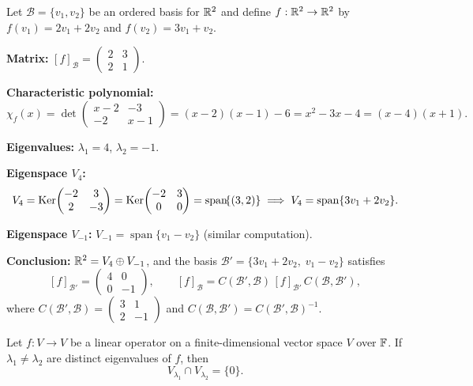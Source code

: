 \begin{exbox}
\label{ex:char-poly}
Let $\mathcal{B}=\{v_1,v_2\}$ be an ordered basis for $\mathbb{R}^2$ and define
$f:\mathbb{R}^2\to\mathbb{R}^2$ by $f(v_1)=2v_1+2v_2$ and $f(v_2)=3v_1+v_2$.

\medskip\noindent
\textbf{Matrix:}
$[f]_{\mathcal{B}} = \begin{pmatrix}2&3\\2&1\end{pmatrix}$.

\medskip\noindent
\textbf{Characteristic polynomial:}
\[
    \chi_f(x)
    = \det\!\begin{pmatrix}x-2&-3\\-2&x-1\end{pmatrix}
    = (x-2)(x-1)-6
    = x^2-3x-4
    = (x-4)(x+1).
\]

\medskip\noindent
\textbf{Eigenvalues:} $\lambda_1=4$, $\lambda_2=-1$.

\medskip\noindent
\textbf{Eigenspace $V_4$:}
\[
    V_4 = \operatorname{Ker}\!\begin{pmatrix}-2&3\\2&-3\end{pmatrix}
        = \operatorname{Ker}\!\begin{pmatrix}-2&3\\0&0\end{pmatrix}
        = \operatorname{span}\!\{(3,2)\}
        \;\Longrightarrow\;
        V_4 = \operatorname{span}\{3v_1+2v_2\}.
\]

\medskip\noindent
\textbf{Eigenspace $V_{-1}$:}
$V_{-1}=\operatorname{span}\{v_1-v_2\}$ (similar computation).

\medskip\noindent
\textbf{Conclusion:}
$\mathbb{R}^2 = V_4\oplus V_{-1}$, and the basis
$\mathcal{B}'=\{3v_1+2v_2,\;v_1-v_2\}$ satisfies
\[
    [f]_{\mathcal{B}'} = \begin{pmatrix}4&0\\0&-1\end{pmatrix},
    \qquad
    [f]_{\mathcal{B}} = C(\mathcal{B}',\mathcal{B})\,[f]_{\mathcal{B}'}\,C(\mathcal{B},\mathcal{B}'),
\]
where $C(\mathcal{B}',\mathcal{B})=\begin{pmatrix}3&1\\2&-1\end{pmatrix}$
and $C(\mathcal{B},\mathcal{B}')=C(\mathcal{B}',\mathcal{B})^{-1}$.
\end{exbox}

\begin{propbox}
\label{prop:eigenspace-intersection}
Let $f:V\to V$ be a linear operator on a finite-dimensional vector space
$V$ over $\mathbb{F}$.  If $\lambda_1\neq\lambda_2$ are distinct eigenvalues of
$f$, then
\[
    V_{\lambda_1}\cap V_{\lambda_2} = \{0\}.
\]
\end{propbox}

